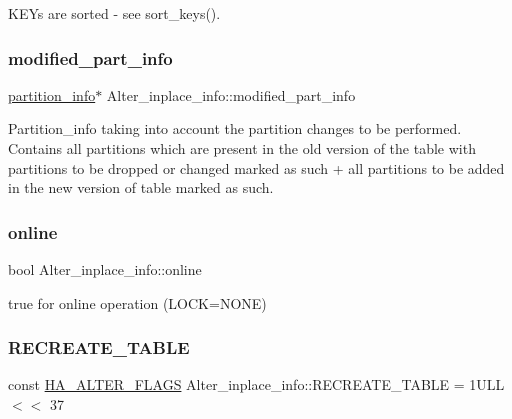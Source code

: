 K\+E\+Ys are sorted -\/ see sort\+\_\+keys(). \mbox{\label{classAlter__inplace__info_aa6d44a3120935d9ef9577beeb89f8c51}} 
\subsubsection{\texorpdfstring{modified\+\_\+part\+\_\+info}{modified\_part\_info}}
{\footnotesize\ttfamily \mbox{\hyperlink{classpartition__info}{partition\+\_\+info}}$\ast$ Alter\+\_\+inplace\+\_\+info\+::modified\+\_\+part\+\_\+info}

Partition\+\_\+info taking into account the partition changes to be performed. Contains all partitions which are present in the old version of the table with partitions to be dropped or changed marked as such + all partitions to be added in the new version of table marked as such. \mbox{\label{classAlter__inplace__info_acb2fbc0369799ac74f9cc74cb14d1bdf}} 
\subsubsection{\texorpdfstring{online}{online}}
{\footnotesize\ttfamily bool Alter\+\_\+inplace\+\_\+info\+::online}

true for online operation (L\+O\+CK=N\+O\+NE) \mbox{\label{classAlter__inplace__info_a30dd1964ce7046dee60a5b9284cdfe0b}} 
\subsubsection{\texorpdfstring{R\+E\+C\+R\+E\+A\+T\+E\+\_\+\+T\+A\+B\+LE}{RECREATE\_TABLE}}
{\footnotesize\ttfamily const \mbox{\hyperlink{classAlter__inplace__info_a45258f36b4942b5cabee7239463daaca}{H\+A\+\_\+\+A\+L\+T\+E\+R\+\_\+\+F\+L\+A\+GS}} Alter\+\_\+inplace\+\_\+info\+::\+R\+E\+C\+R\+E\+A\+T\+E\+\_\+\+T\+A\+B\+LE = 1\+U\+L\+L $<$$<$ 37\hspace{0.3cm}{\ttfamily [static]}}

